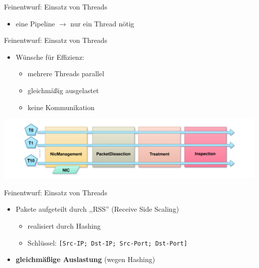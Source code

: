 \documentclass{beamer}
\begin{document}
\begin{frame}{Feinentwurf: Einsatz von Threads}
    \begin{itemize}
        \item eine Pipeline \(\rightarrow\) nur ein Thread nötig
    \end{itemize}
\end{frame}

\begin{frame}{Feinentwurf: Einsatz von Threads}
    \begin{itemize}
        \item Wünsche für Effizienz:
              \begin{itemize}
                  \item mehrere Threads parallel
                  \item gleichmäßig ausgelastet
                  \item keine Kommunikation
              \end{itemize}
    \end{itemize}
    \includegraphics[width=\linewidth]{multithreading2.pdf}
\end{frame}

\begin{frame}{Feinentwurf: Einsatz von Threads}
    \begin{itemize}
        \item Pakete aufgeteilt durch ,,RSS'' (Receive Side Scaling)
              \begin{itemize}
                  \item realisiert durch Hashing
                  \item Schlüssel: \texttt{[Src-IP; Dst-IP; Src-Port; Dst-Port]}
              \end{itemize}
    \end{itemize}
    \begin{figure}
        \center
    \end{figure}
    \begin{itemize}
        \item \textbf{gleichmäßige Auslastung} (wegen Hashing)
    \end{itemize}
\end{frame}
\end{document}
